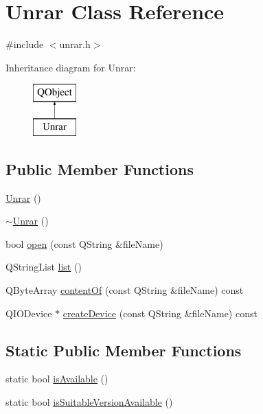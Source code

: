 \hypertarget{classUnrar}{\section{Unrar Class Reference}
\label{classUnrar}
}


{\ttfamily \#include $<$unrar.\+h$>$}

Inheritance diagram for Unrar\+:\begin{figure}[H]
\begin{center}
\leavevmode
\includegraphics[height=2.000000cm]{classUnrar}
\end{center}
\end{figure}
\subsection*{Public Member Functions}
\begin{DoxyCompactItemize}
\item 
\hyperlink{classUnrar_aa20527d252a87bc40925a5afe22dd313}{Unrar} ()
\item 
\hyperlink{classUnrar_af688ddc3ffbb9b07bc667c576a4fa008}{$\sim$\+Unrar} ()
\item 
bool \hyperlink{classUnrar_ad3e0aa6e1af9ecd001781c24422ca531}{open} (const Q\+String \&file\+Name)
\item 
Q\+String\+List \hyperlink{classUnrar_a2d703bdd105451ed726a2ab4d85528cb}{list} ()
\item 
Q\+Byte\+Array \hyperlink{classUnrar_a00c273a845fdc6a75286de8d89a2223f}{content\+Of} (const Q\+String \&file\+Name) const 
\item 
Q\+I\+O\+Device $\ast$ \hyperlink{classUnrar_a455769d0f1aedf1870eafd19e9c1c76a}{create\+Device} (const Q\+String \&file\+Name) const 
\end{DoxyCompactItemize}
\subsection*{Static Public Member Functions}
\begin{DoxyCompactItemize}
\item 
static bool \hyperlink{classUnrar_a2e97c9cb1a32bba23e7df17806668ba2}{is\+Available} ()
\item 
static bool \hyperlink{classUnrar_a142581395536a82553f2855962e14055}{is\+Suitable\+Version\+Available} ()
\end{DoxyCompactItemize}


